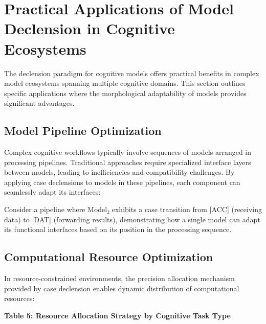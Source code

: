 \hypertarget{practical-applications-of-model-declension-in-cognitive-ecosystems}{%
\section{Practical Applications of Model Declension in Cognitive
Ecosystems}\label{practical-applications-of-model-declension-in-cognitive-ecosystems}}

The declension paradigm for cognitive models offers practical benefits
in complex model ecosystems spanning multiple cognitive domains. This
section outlines specific applications where the morphological
adaptability of models provides significant advantages.

\hypertarget{model-pipeline-optimization}{%
\subsection{Model Pipeline
Optimization}\label{model-pipeline-optimization}}

Complex cognitive workflows typically involve sequences of models
arranged in processing pipelines. Traditional approaches require
specialized interface layers between models, leading to inefficiencies
and compatibility challenges. By applying case declensions to models in
these pipelines, each component can seamlessly adapt its interfaces:

Consider a pipeline where Model₂ exhibits a case transition from
{[}ACC{]} (receiving data) to {[}DAT{]} (forwarding results),
demonstrating how a single model can adapt its functional interfaces
based on its position in the processing sequence.

\hypertarget{computational-resource-optimization}{%
\subsection{Computational Resource
Optimization}\label{computational-resource-optimization}}

In resource-constrained environments, the precision allocation mechanism
provided by case declension enables dynamic distribution of
computational resources:

\textbf{Table 5: Resource Allocation Strategy by Cognitive Task Type}

